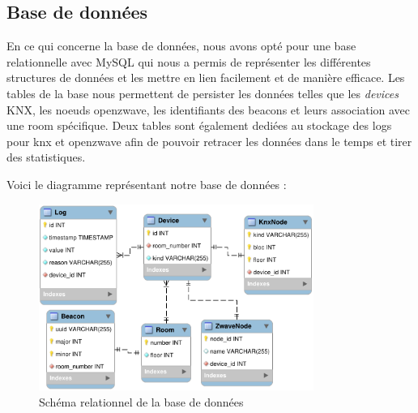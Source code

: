 \subsection{Base de données}
En ce qui concerne la base de données, nous avons opté pour une base relationnelle avec MySQL \cite{mysql} qui nous a permis de représenter les différentes structures de données et les mettre en lien facilement et de manière efficace.
Les tables de la base nous permettent de persister les données telles que les \textit{devices} KNX, les noeuds openzwave, les identifiants des beacons et leurs association avec une room spécifique. Deux tables sont également dediées au stockage des logs pour knx et openzwave afin de pouvoir retracer les données dans le temps et tirer des statistiques.

Voici le diagramme représentant notre base de données :
\begin{figure}
    \begin{center}
        \includegraphics[width=0.8\textwidth]{img/mysql-shema.png}
    \end{center}
    \caption{Schéma relationnel de la base de données}
    \label{db_schema}
\end{figure}

